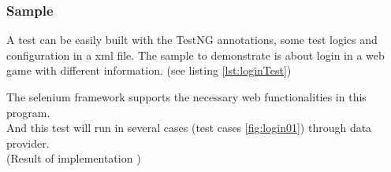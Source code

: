 \documentclass[12pt,a4paper,bibliography=totocnumbered,listof=totocnumbered]{article}
\begin{document}
\subsubsection{Sample}
A test can be easily built with the TestNG annotations, some test logics and configuration in a xml file. 
The sample to demonstrate is about login in a web game with different information. (see listing \ref{lst:loginTest})
\vspace{1em}

The selenium framework supports the necessary web functionalities in this program.\\ And this test will run in several cases (test cases \ref{fig:login01}) through data provider.\\ 
(Result of implementation )
\newline
\end{document}
